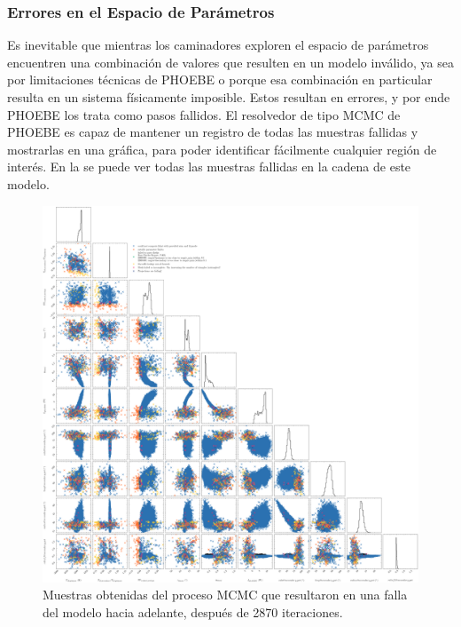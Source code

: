 \subsubsection{Errores en el Espacio de Parámetros}

Es inevitable que mientras los caminadores exploren el espacio de parámetros
encuentren una combinación de valores que resulten en un modelo inválido, ya sea
por limitaciones técnicas de PHOEBE o porque esa combinación en particular
resulta en un sistema físicamente imposible. Estos resultan en errores, y por
ende PHOEBE los trata como pasos fallidos. El resolvedor de tipo MCMC de PHOEBE
es capaz de mantener un registro de todas las muestras fallidas y mostrarlas en
una gráfica, para poder identificar fácilmente cualquier región de interés. En
la  se puede ver todas las muestras
fallidas en la cadena de este modelo.

\begin{figure}[!ht]
	\centering
	\includegraphics[scale=0.26]{Metodologia/Secciones/ModeloComputacional/Figures/Figura MCMC Failed.png}
	\caption{Muestras obtenidas del proceso MCMC que resultaron en una falla del modelo hacia adelante, después de 2870 iteraciones.}
	\label{figuraMcmcMuestrasFallidas}
\end{figure}

